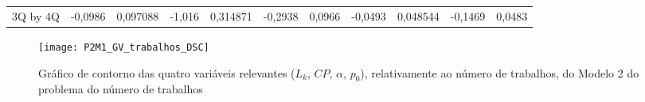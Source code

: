 \begin{table}[H]
{\begin{tabular}{lllllllllll}
\rowcolor[HTML]{FFFFFF} 
3Q by 4Q       & -0,0986                         & 0,097088                        & -1,016                          & 0,314871                        & -0,2938                         & 0,0966                          & -0,0493                         & 0,048544                        & -0,1469                         & 0,0483                         
\end{tabular}
}
\end{table}

\begin{figure}[H]
\caption{Gráfico de contorno das quatro variáveis relevantes ($L_{k}$, $CP$, $\alpha$, $p_{0}$), relativamente ao número de trabalhos, do Modelo 2 do problema do número de trabalhos}
\centering
\texttt{[image: P2M1\_GV\_trabalhos\_DSC]}
\end{figure}

